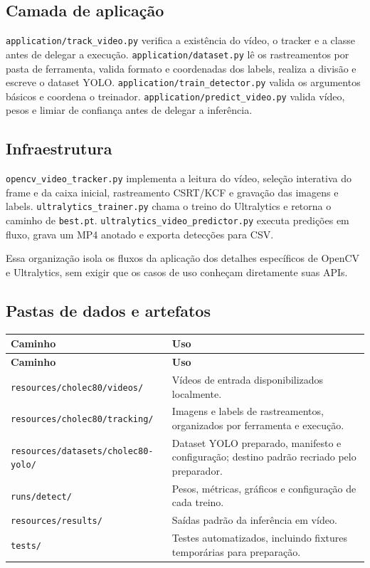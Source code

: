 \documentclass[12pt,a4paper]{article}
\begin{document}
\subsection{Camada de aplicação}

\texttt{application/track\_video.py} verifica a existência do vídeo, o tracker e a classe antes de delegar a execução. \texttt{application/dataset.py} lê os rastreamentos por pasta de ferramenta, valida formato e coordenadas dos labels, realiza a divisão e escreve o dataset YOLO. \texttt{application/train\_detector.py} valida os argumentos básicos e coordena o treinador. \texttt{application/predict\_video.py} valida vídeo, pesos e limiar de confiança antes de delegar a inferência.

\subsection{Infraestrutura}

\texttt{opencv\_video\_tracker.py} implementa a leitura do vídeo, seleção interativa do frame e da caixa inicial, rastreamento CSRT/KCF e gravação das imagens e labels. \texttt{ultralytics\_trainer.py} chama o treino do Ultralytics e retorna o caminho de \texttt{best.pt}. \texttt{ultralytics\_video\_predictor.py} executa predições em fluxo, grava um MP4 anotado e exporta detecções para CSV.

Essa organização isola os fluxos da aplicação dos detalhes específicos de OpenCV e Ultralytics, sem exigir que os casos de uso conheçam diretamente suas APIs.

\subsection{Pastas de dados e artefatos}

\begin{longtable}{p{}p{}}
\toprule
\textbf{Caminho} & \textbf{Uso} \\
\midrule
\endfirsthead
\toprule
\textbf{Caminho} & \textbf{Uso} \\
\midrule
\endhead
\texttt{resources/cholec80/videos/} & Vídeos de entrada disponibilizados localmente. \\
\texttt{resources/cholec80/tracking/} & Imagens e labels de rastreamentos, organizados por ferramenta e execução. \\
\texttt{resources/datasets/cholec80-yolo/} & Dataset YOLO preparado, manifesto e configuração; destino padrão recriado pelo preparador. \\
\texttt{runs/detect/} & Pesos, métricas, gráficos e configuração de cada treino. \\
\texttt{resources/results/} & Saídas padrão da inferência em vídeo. \\
\texttt{tests/} & Testes automatizados, incluindo fixtures temporárias para preparação. \\
\bottomrule
\end{longtable}
\end{document}
